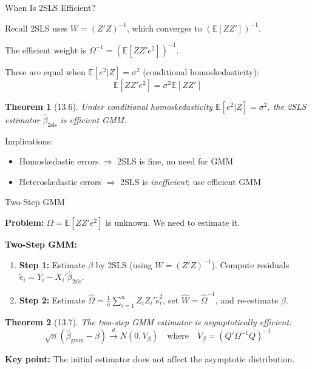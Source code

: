 \documentclass[aspectratio=169, handout, t]{beamer}
\newtheorem{thm}{Theorem}
\numberwithin{equation}{section}
\begin{document}
\begin{frame}{When Is 2SLS Efficient?}

Recall 2SLS uses $W = (Z'Z)^{-1}$, which converges to $(\mathbb{E}[ZZ'])^{-1}$.

\medskip
The efficient weight is $\Omega^{-1} = (\mathbb{E}[ZZ'e^2])^{-1}$.

\medskip
These are equal when $\mathbb{E}[e^2 | Z] = \sigma^2$ (conditional homoskedasticity):
$$\mathbb{E}[ZZ'e^2] = \sigma^2 \mathbb{E}[ZZ']$$

\begin{thm}[13.6]
Under conditional homoskedasticity $\mathbb{E}[e^2 | Z] = \sigma^2$, the 2SLS estimator $\hat\beta_{\text{2sls}}$ is efficient GMM.
\end{thm}

\smallskip
\alert{Implications:}
\begin{itemize}
\item Homoskedastic errors $\Rightarrow$ 2SLS is fine, no need for GMM
\item Heteroskedastic errors $\Rightarrow$ 2SLS is \textit{inefficient}; use efficient GMM
\end{itemize}

\end{frame}

\begin{frame}{Two-Step GMM}

\textbf{Problem:} $\Omega = \mathbb{E}[ZZ'e^2]$ is unknown. We need to estimate it.

\medskip
\textbf{Two-Step GMM:}
\begin{enumerate}
\item \textbf{Step 1:} Estimate $\beta$ by 2SLS (using $W = (Z'Z)^{-1}$). Compute residuals $\tilde{e}_i = Y_i - X_i'\hat\beta_{\text{2sls}}$.
\item \textbf{Step 2:} Estimate $\hat\Omega = \frac{1}{n}\sum_{i=1}^n Z_iZ_i'\tilde{e}_i^2$, set $\hat{W} = \hat\Omega^{-1}$, and re-estimate $\beta$.
\end{enumerate}

\begin{thm}[13.7]
The two-step GMM estimator is asymptotically efficient:
$$\sqrt{n}(\hat\beta_{\text{gmm}} - \beta) \xrightarrow{d} N(0, V_\beta)\quad\text{where}\quad V_\beta = (Q'\Omega^{-1}Q)^{-1}$$
\end{thm}

\textbf{Key point:} The initial estimator does not affect the asymptotic distribution.

\end{frame}
\end{document}
